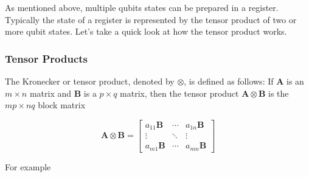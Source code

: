 \documentclass[11pt, oneside]{article}   	%
\begin{document}
\noindent
As mentioned above, multiple qubits states can be prepared in a register. Typically the state of a register is represented by the tensor
product \cite{wiki:kronecker} of two or more qubit states. Let's take a quick look at how the tensor product works. 


\subsubsection{Tensor Products}

The Kronecker or tensor product, denoted by $\otimes$, is defined as follows: If
$\mathbf{A}$ is an $m \times n$ matrix and $\mathbf{B}$ is a $p \times q$ matrix, then the tensor product
$\mathbf{A} \otimes \mathbf{B}$ is the $mp \times nq$ block matrix

\bigskip
\begin{equation*}
\mathbf {A} \otimes \mathbf {B} =
\begin{bmatrix}a_{11}\mathbf {B} &\cdots &a_{1n}\mathbf {B} \\\vdots &\ddots &\vdots \\a_{m1}\mathbf {B} &\cdots &a_{mn}\mathbf {B} 
\end{bmatrix}
\end{equation*}

\bigskip
\noindent
For example \cite{wiki:kronecker}
\end{document}
